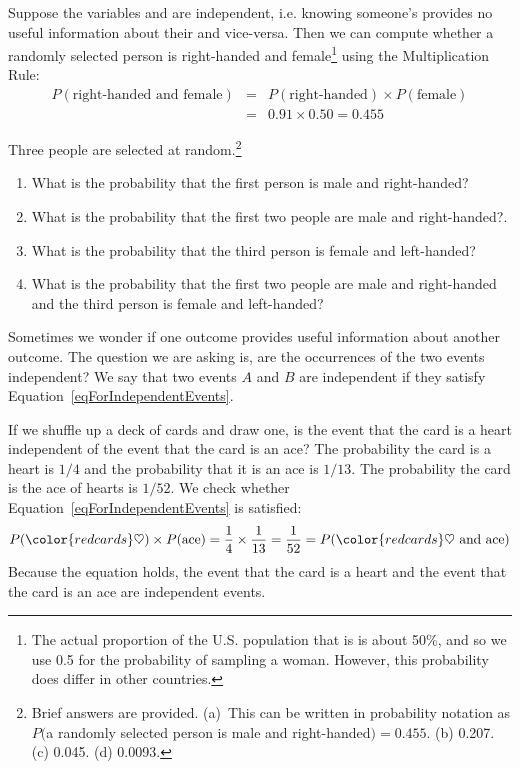 Suppose the variables  and  are independent, i.e. knowing someone's  provides no useful information about their  and vice-versa. Then we can compute whether a randomly selected person is right-handed and female\footnote{The actual proportion of the U.S. population that is  is about 50\%, and so we use 0.5 for the probability of sampling a woman. However, this probability does differ in other countries.} using the Multiplication Rule:
\begin{eqnarray*}
P(\text{right-handed and female}) &=& P(\text{right-handed}) \times  P(\text{female}) \\
&=& 0.91 \times  0.50 = 0.455
\end{eqnarray*}


\begin{exercise}
Three people are selected at random.\footnote{Brief answers are provided. (a)~This can be written in probability notation as $P($a randomly selected person is male and right-handed$)=0.455$. (b) 0.207. (c) 0.045. (d) 0.0093.} \vspace{-1.5mm}
\begin{enumerate}
\setlength{\itemsep}{0mm}
\item[(a)] What is the probability that the first person is male and right-handed?
\item[(b)] What is the probability that the first two people are male and right-handed?.
\item[(c)] What is the probability that the third person is female and left-handed?
\item[(d)] What is the probability that the first two people are male and right-handed and the third person is female and left-handed?
\end{enumerate}
\end{exercise}

Sometimes we wonder if one outcome provides useful information about another outcome. The question we are asking is, are the occurrences of the two events independent? We say that two events $A$ and $B$ are independent if they satisfy Equation~\eqref{eqForIndependentEvents}.

\begin{example}{If we shuffle up a deck of cards and draw one, is the event that the card is a heart independent of the event that the card is an ace?}
The probability the card is a heart is $1/4$ and the probability that it is an ace is $1/13$. The probability the card is the ace of hearts is $1/52$. We check whether Equation~\ref{eqForIndependentEvents} is satisfied:
\begin{align*}
P({\color{redcards}\heartsuit})\times P(\text{ace}) = \frac{1}{4}\times \frac{1}{13} = \frac{1}{52}
					= P({\color{redcards}\heartsuit}\text{ and ace})
\end{align*}
Because the equation holds, the event that the card is a heart and the event that the card is an ace are independent events.
\end{example}

